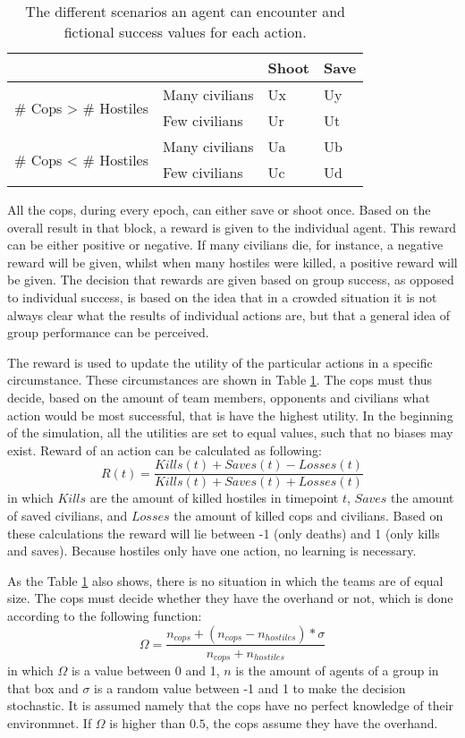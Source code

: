 \begin{table}[!ht]
\begin{center}
\begin{tabular}{l l | l l}
\hline
 & & Shoot & Save \\
\hline
\multirow{2}{*}{\# Cops > \# Hostiles} & Many civilians & Ux & Uy \\
 & Few civilians & Ur & Ut \\
\hline
\multirow{2}{*}{\# Cops < \# Hostiles} & Many civilians & Ua & Ub\\
 & Few civilians & Uc & Ud\\
\hline
\end{tabular}
\caption{The different scenarios an agent can encounter and fictional success values for each action.}
\label{tab:scenarios}
\end{center}
\end{table}
All the cops, during every epoch, can either save or shoot once. Based on the overall result in that block, a reward is given to the individual agent. This reward can be either positive or negative. If many civilians die, for instance, a negative reward will be given, whilst when many hostiles were killed, a positive reward will be given. The decision that rewards are given based on group success, as opposed to individual success, is based on the idea that in a crowded situation it is not always clear what the results of individual actions are, but that a general idea of group performance can be perceived. 

The reward is used to update the utility of the particular actions in a specific circumstance. These circumstances are shown in Table \ref{tab:scenarios}. The cops must thus decide, based on the amount of team members, opponents and civilians what action would be most successful, that is have the highest utility. In the beginning of the simulation, all the utilities are set to equal values, such that no biases may exist. Reward of an action can be calculated as following: 
$$ R(t) = \frac{Kills(t) + Saves(t) - Losses(t)}{Kills(t) + Saves(t) + Losses(t)}$$
in which $Kills$ are the amount of killed hostiles in timepoint $t$, $Saves$ the amount of saved civilians, and $Losses$ the amount of killed cops and civilians. Based on these calculations the reward will lie between -1 (only deaths) and 1 (only kills and saves). Because hostiles only have one action, no learning is necessary. 

As the Table \ref{tab:scenarios} also shows, there is no situation in which the teams are of equal size. The cops must decide whether they have the overhand or not, which is done according to the following function:
$$ \Omega = \frac{n_{cops} + (n_{cops}-n_{hostiles})*\sigma}{n_{cops} + n_{hostiles}} $$
in which $\Omega$ is a value between 0 and 1, $n$ is the amount of agents of a group in that box and $\sigma$ is a random value between -1 and 1 to make the decision stochastic. It is assumed namely that the cops have no perfect knowledge of their environmnet. If $\Omega$ is higher than $0.5$, the cops assume they have the overhand.

